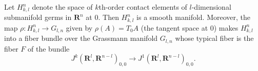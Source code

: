 Let $H_{k,l}^n$ denote the space of $k$th-order contact elements of $l$-dimensional submanifold germs in $\mathbf{R}^n$ at $0$. Then $H_{k,l}^n$ is a smooth manifold. Moreover, the map $\rho: H_{k,l}^n \to G_{l,n}$ given by $\rho(A) = T_0 A$ (the tangent space at $0$) makes $H_{k,l}^n$ into a fiber bundle over the Grassmann manifold $G_{l,n}$ whose typical fiber is the fiber $F$ of the bundle
$$
J^k(\mathbf{R}^l, \mathbf{R}^{n-l})_{0,0} \to J^1(\mathbf{R}^l, \mathbf{R}^{n-l})_{0,0}.
$$

